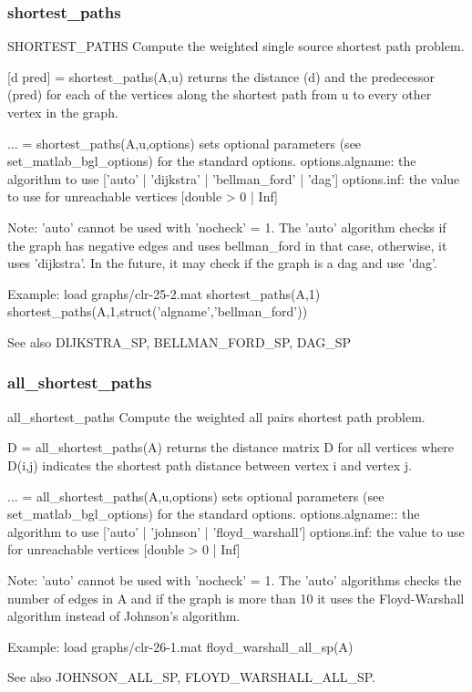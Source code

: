 \subsubsection*{shortest\_paths}
\begin{mcode}
  SHORTEST_PATHS Compute the weighted single source shortest path problem.
 
  [d pred] = shortest_paths(A,u) returns the distance (d) and the predecessor
  (pred) for each of the vertices along the shortest path from u to every
  other vertex in the graph.  
  
  ... = shortest_paths(A,u,options) sets optional parameters (see 
  set_matlab_bgl_options) for the standard options.
    options.algname: the algorithm to use 
        [{'auto'} | 'dijkstra' | 'bellman_ford' | 'dag']
    options.inf: the value to use for unreachable vertices 
        [double > 0 | {Inf}]
 
  Note: 'auto' cannot be used with 'nocheck' = 1.  The 'auto' algorithm
  checks if the graph has negative edges and uses bellman_ford in that
  case, otherwise, it uses 'dijkstra'.  In the future, it may check if the
  graph is a dag and use 'dag'.  
 
  Example:
     load graphs/clr-25-2.mat
     shortest_paths(A,1)
     shortest_paths(A,1,struct('algname','bellman_ford'))
 
  See also DIJKSTRA_SP, BELLMAN_FORD_SP, DAG_SP
\end{mcode}
\newpage
\subsubsection*{all\_shortest\_paths}
\begin{mcode}
  all_shortest_paths Compute the weighted all pairs shortest path problem.
 
  D = all_shortest_paths(A) returns the distance matrix D for all vertices
  where D(i,j) indicates the shortest path distance between vertex i and
  vertex j.  
  
  ... = all_shortest_paths(A,u,options) sets optional parameters (see 
  set_matlab_bgl_options) for the standard options.
    options.algname:: the algorithm to use 
        [{'auto'} | 'johnson' | 'floyd_warshall']
    options.inf: the value to use for unreachable vertices 
        [double > 0 | {Inf}]
 
  Note: 'auto' cannot be used with 'nocheck' = 1.  The 'auto' algorithms
  checks the number of edges in A and if the graph is more than 10%
  it uses the Floyd-Warshall algorithm instead of Johnson's algorithm.
 
  Example:
     load graphs/clr-26-1.mat
     floyd_warshall_all_sp(A)
 
  See also JOHNSON_ALL_SP, FLOYD_WARSHALL_ALL_SP.
\end{mcode}
\newpage

